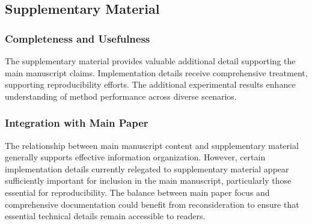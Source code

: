 \subsection{Supplementary Material}
\subsubsection{Completeness and Usefulness}
The supplementary material provides valuable additional detail supporting the main manuscript claims. Implementation details receive comprehensive treatment, supporting reproducibility efforts. The additional experimental results enhance understanding of method performance across diverse scenarios.

\subsubsection{Integration with Main Paper}
The relationship between main manuscript content and supplementary material generally supports effective information organization. However, certain implementation details currently relegated to supplementary material appear sufficiently important for inclusion in the main manuscript, particularly those essential for reproducibility. The balance between main paper focus and comprehensive documentation could benefit from reconsideration to ensure that essential technical details remain accessible to readers.
